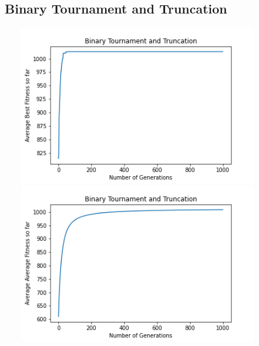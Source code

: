 \documentclass[a4paper]{article}
\begin{document}
\subsection{Binary Tournament and Truncation}
\includegraphics[width=12cm, height=7cm]{Graphs/KnapSack/bt_trunc_bsf.png} \\
\includegraphics[width=12cm, height=7cm]{Graphs/KnapSack/bt_trunc_avg.png} \\
\end{document}
